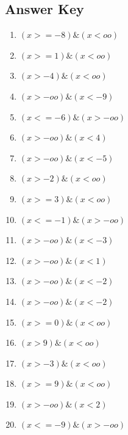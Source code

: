 \documentclass{article}
\begin{document}
\newpage

\subsection*{Answer Key}

\begin{enumerate}
\item $\displaystyle (x >= -8) \& (x < oo) $ \ 
\item $\displaystyle (x >= 1) \& (x < oo) $ \ 
\item $\displaystyle (x > -4) \& (x < oo) $ \ 
\item $\displaystyle (x > -oo) \& (x < -9) $ \ 
\item $\displaystyle (x <= -6) \& (x > -oo) $ \ 
\item $\displaystyle (x > -oo) \& (x < 4) $ \ 
\item $\displaystyle (x > -oo) \& (x < -5) $ \ 
\item $\displaystyle (x > -2) \& (x < oo) $ \ 
\item $\displaystyle (x >= 3) \& (x < oo) $ \ 
\item $\displaystyle (x <= -1) \& (x > -oo) $ \ 
\item $\displaystyle (x > -oo) \& (x < -3) $ \ 
\item $\displaystyle (x > -oo) \& (x < 1) $ \ 
\item $\displaystyle (x > -oo) \& (x < -2) $ \ 
\item $\displaystyle (x > -oo) \& (x < -2) $ \ 
\item $\displaystyle (x >= 0) \& (x < oo) $ \ 
\item $\displaystyle (x > 9) \& (x < oo) $ \ 
\item $\displaystyle (x > -3) \& (x < oo) $ \ 
\item $\displaystyle (x >= 9) \& (x < oo) $ \ 
\item $\displaystyle (x > -oo) \& (x < 2) $ \ 
\item $\displaystyle (x <= -9) \& (x > -oo) $ \ 

\end{enumerate}
\end{document}
